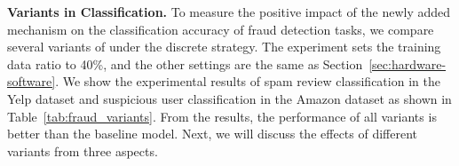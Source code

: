 \begin{table}[t]
    \setlength{\abovecaptionskip}{0.cm}
    \setlength{\belowcaptionskip}{-0.cm}
    \caption{Fraud Detection classification results ($\%$) compared to \RioGNN variants.}\label{tab:fraud_variants}
    \centering
\end{table}



\textbf{\RioGNN Variants in Classification. }
To measure the positive impact of the newly added mechanism on the classification accuracy of fraud detection tasks, we compare several variants of \RioGNN under the discrete strategy.
The experiment sets the training data ratio to 40\%, and the other settings are the same as Section~\ref{sec:hardware-software}.
We show the experimental results of spam review classification in the Yelp dataset and suspicious user classification in the Amazon dataset as shown in Table~\ref{tab:fraud_variants}.
From the results, the performance of all variants is better than the baseline model. Next, we will discuss the effects of different variants from three aspects.


